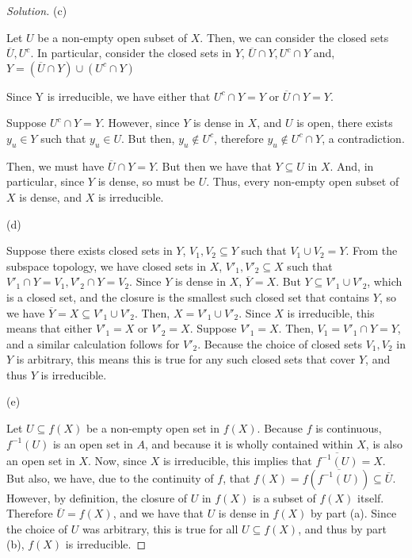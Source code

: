 \documentclass[10pt]{article}
\begin{document}
\begin{proof}[Solution]
(c)

Let $U$ be a non-empty open subset of $X$. Then, we can consider the closed sets $\overline{U}, U^c$. In particular, consider the closed sets in $Y$, $\overline{U}\cap Y, U^c \cap Y$ and, $Y = (\overline{U}\cap Y) \cup (U^c \cap Y)$ 

Since Y is irreducible, we have either that  $U^c \cap Y = Y$ or $\overline{U}\cap Y = Y$.

Suppose $U^c \cap Y = Y$. However, since $Y$ is dense in $X$, and $U$ is open, there exists $y_u \in Y$ such that $y_u \in U$. But then, $y_u \not \in U^c$, therefore $y_u \not \in U^c \cap Y$, a contradiction.

Then, we must have $\overline{U}\cap Y = Y$. But then we have that $Y \subseteq U$ in $X$. And, in particular, since $Y$ is dense, so must be $U$. Thus, every non-empty open subset of $X$ is dense, and $X$ is irreducible.

(d)

Suppose there exists closed sets in $Y$, $V_1, V_2 \subseteq Y$ such that $V_1 \cup V_2 = Y$. From the subspace topology, we have closed sets in $X$, $V'_1, V'_2 \subseteq X$ such that $V'_1 \cap Y = V_1, V'_2 \cap Y = V_2$. Since $Y$ is dense in $X$, $\overline{Y} = X$. But  $Y \subseteq V'_1 \cup V'_2$, which is a closed set, and the closure is the smallest such closed set that contains $Y$, so we have $\overline{Y} = X \subseteq V'_1 \cup V'_2$. Then, $X = V'_1 \cup V'_2$. Since $X$ is irreducible, this means that either $V'_1 = X$ or $V'_2 = X$. Suppose $V'_1 = X$. Then, $V_1 = V'_1 \cap Y = Y$, and a similar calculation follows for $V'_2$. Because the choice of closed sets $V_1, V_2$ in $Y$ is arbitrary, this means this is true for any such closed sets that cover $Y$, and thus $Y$ is irreducible. 

(e)

Let $U \subseteq f(X)$ be a non-empty open set in $f(X)$. Because $f$ is continuous, $f^{-1}(U)$ is an open set in $A$, and because it is wholly contained within $X$, is also an open set in $X$. Now, since $X$ is irreducible, this implies that $\overline{f^{-1}(U)} = X$. But also, we have, due to the continuity of $f$, that $f(X) = f(\overline{f^{-1}(U)}) \subseteq \overline{U}$. However, by definition, the closure of $U$ in $f(X)$ is a subset of $f(X)$ itself. Therefore $\overline{U} = f(X)$, and we have that $U$ is dense in $f(X)$ by part (a). Since the choice of $U$ was arbitrary, this is true for all $U \subseteq f(X)$, and thus by part (b), $f(X)$ is irreducible.


\end{proof}
\end{document}

